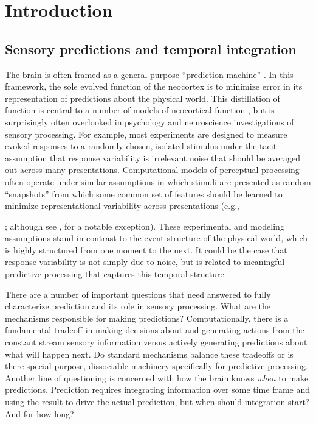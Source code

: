 \documentclass[dwyatte_dissertation.tex]{subfiles}
\begin{document}
\chapter{Introduction}
\label{chap:intro}

\section{Sensory predictions and temporal integration}
The brain is often framed as a general purpose ``prediction machine'' \cite{HawkinsBlakeslee04,Clark13}. In this framework, the sole evolved function of the neocortex is to minimize error in its representation of predictions about the physical world. This distillation of function is central to a number of models of neocortical function \cite[e.g.,]{DayanHintonNealEtAl95,RaoBallard99,LeeMumford03,Friston05,GeorgeHawkins09}, but is surprisingly often overlooked in psychology and neuroscience investigations of sensory processing. For example, most experiments are designed to measure evoked responses to a randomly chosen, isolated stimulus under the tacit assumption that response variability is irrelevant noise that should be averaged out across many presentations. Computational models of perceptual processing often operate under similar assumptions in which stimuli are presented as random ``snapshots'' from which some common set of features should be learned to minimize representational variability across presentations (e.g., {; although see , for a notable exception). These experimental and modeling assumptions stand in contrast to the event structure of the physical world, which is highly structured from one moment to the next. It could be the case that response variability is not simply due to noise, but is related to meaningful predictive processing that captures this temporal structure \cite{ArieliSterkinGrinvaldEtAl96,WilderJonesAhmedEtAl13,FischerWhitney14}.

There are a number of important questions that need answered to fully characterize prediction and its role in sensory processing. What are the mechanisms responsible for making predictions? Computationally, there is a fundamental tradeoff in making decisions about and generating actions from the constant stream sensory information versus actively generating predictions about what will happen next. Do standard mechanisms balance these tradeoffs or is there special purpose, dissociable machinery specifically for predictive processing. Another line of questioning is concerned with how the brain knows \textit{when} to make predictions. Prediction requires integrating information over some time frame and using the result to drive the actual prediction, but when should integration start? And for how long? 

}
\end{document}
